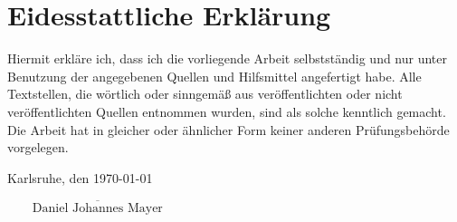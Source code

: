 %
%

\chapter*{Eidesstattliche Erklärung}
\thispagestyle{empty}
Hiermit erkläre ich, dass ich die vorliegende Arbeit selbstständig und nur unter Benutzung der angegebenen Quellen und Hilfsmittel angefertigt habe. Alle Textstellen, die wörtlich oder sinngemäß aus veröffentlichten oder nicht veröffentlichten Quellen entnommen wurden, sind als solche kenntlich gemacht. Die Arbeit hat in gleicher oder ähnlicher Form keiner anderen Prüfungsbehörde vorgelegen.
 \vspace{2\baselineskip}

\noindent Karlsruhe, den \today
\begin{flushright}
$\overline{~~~~~~~~~\mbox{Daniel Johannes Mayer}~~~~~~~~~}$
\end{flushright}